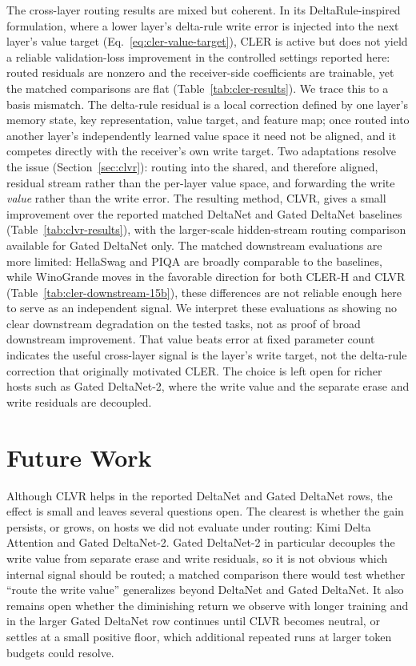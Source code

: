 \documentclass{article}
\begin{document}
The cross-layer routing results are mixed but coherent. In its DeltaRule-inspired formulation, where a lower layer's delta-rule write error is injected into the next layer's value target (Eq.~\eqref{eq:cler-value-target}), CLER is active but does not yield a reliable validation-loss improvement in the controlled settings reported here: routed residuals are nonzero and the receiver-side coefficients are trainable, yet the matched comparisons are flat (Table~\ref{tab:cler-results}). We trace this to a basis mismatch. The delta-rule residual is a local correction defined by one layer's memory state, key representation, value target, and feature map; once routed into another layer's independently learned value space it need not be aligned, and it competes directly with the receiver's own write target. Two adaptations resolve the issue (Section~\ref{sec:clvr}): routing into the shared, and therefore aligned, residual stream rather than the per-layer value space, and forwarding the write \emph{value} rather than the write error. The resulting method, CLVR, gives a small improvement over the reported matched DeltaNet and Gated DeltaNet baselines (Table~\ref{tab:clvr-results}), with the larger-scale hidden-stream routing comparison available for Gated DeltaNet only. The matched downstream evaluations are more limited: HellaSwag and PIQA are broadly comparable to the baselines, while WinoGrande moves in the favorable direction for both CLER-H and CLVR (Table~\ref{tab:cler-downstream-15b}), these differences are not reliable enough here to serve as an independent signal. We interpret these evaluations as showing no clear downstream degradation on the tested tasks, not as proof of broad downstream improvement. That value beats error at fixed parameter count indicates the useful cross-layer signal is the layer's write target, not the delta-rule correction that originally motivated CLER. The choice is left open for richer hosts such as Gated DeltaNet-2, where the write value and the separate erase and write residuals are decoupled.


\section{Future Work}

Although CLVR helps in the reported DeltaNet and Gated DeltaNet rows, the effect is small and leaves several questions open. The clearest is whether the gain persists, or grows, on hosts we did not evaluate under routing: Kimi Delta Attention and Gated DeltaNet-2. Gated DeltaNet-2 in particular decouples the write value from separate erase and write residuals, so it is not obvious which internal signal should be routed; a matched comparison there would test whether ``route the write value'' generalizes beyond DeltaNet and Gated DeltaNet. It also remains open whether the diminishing return we observe with longer training and in the larger Gated DeltaNet row continues until CLVR becomes neutral, or settles at a small positive floor, which additional repeated runs at larger token budgets could resolve.
\end{document}

